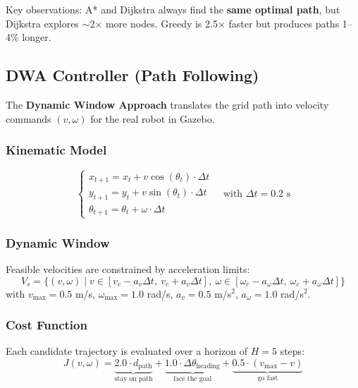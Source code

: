 \documentclass[12pt, a4paper]{article}
\begin{document}
Key observations: A* and Dijkstra always find the \textbf{same optimal path}, but Dijkstra explores $\sim$2$\times$ more nodes. Greedy is 2.5$\times$ faster but produces paths 1--4\% longer.

\subsection{DWA Controller (Path Following)}

The \textbf{Dynamic Window Approach} translates the grid path into velocity commands $(v, \omega)$ for the real robot in Gazebo.

\subsubsection{Kinematic Model}
\begin{equation}
\begin{cases}
x_{t+1} = x_t + v \cos(\theta_t) \cdot \Delta t \\
y_{t+1} = y_t + v \sin(\theta_t) \cdot \Delta t \\
\theta_{t+1} = \theta_t + \omega \cdot \Delta t
\end{cases}
\quad \text{with } \Delta t = 0.2 \text{ s}
\end{equation}

\subsubsection{Dynamic Window}
Feasible velocities are constrained by acceleration limits:
\begin{equation}
V_s = \{(v, \omega) \mid v \in [v_c - a_v \Delta t,\ v_c + a_v \Delta t],\ \omega \in [\omega_c - a_\omega \Delta t,\ \omega_c + a_\omega \Delta t]\}
\end{equation}
with $v_{\max} = 0.5$ m/s, $\omega_{\max} = 1.0$ rad/s, $a_v = 0.5$ m/s$^2$, $a_\omega = 1.0$ rad/s$^2$.

\subsubsection{Cost Function}
Each candidate trajectory is evaluated over a horizon of $H = 5$ steps:
\begin{equation}
J(v, \omega) = \underbrace{2.0 \cdot d_{\text{path}}}_{\text{stay on path}} + \underbrace{1.0 \cdot \Delta\theta_{\text{heading}}}_{\text{face the goal}} + \underbrace{0.5 \cdot (v_{\max} - v)}_{\text{go fast}}
\end{equation}
\end{document}
